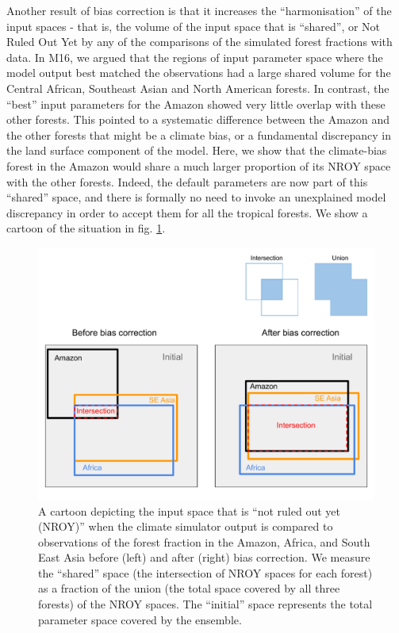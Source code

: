 \documentclass[gmd, manuscript]{copernicus}
\begin{document}
Another result of bias correction is that it increases the ``harmonisation'' of the input spaces - that is, the volume of the input space that is ``shared'', or Not Ruled Out Yet by any of the comparisons of the simulated forest fractions with data. In M16, we argued that the regions of input parameter space where the model output best matched the observations had a large shared volume for the Central African, Southeast Asian and North American forests. In contrast, the ``best'' input parameters for the Amazon showed very little overlap with these other forests. This pointed to a systematic difference between the Amazon and the other forests that might be a climate bias, or a fundamental discrepancy in the land surface component of the model. Here, we show that the climate-bias forest in the Amazon would share a much larger proportion of its NROY space with the other forests. Indeed, the default parameters are now part of this ``shared'' space, and there is formally no need to invoke an unexplained model discrepancy in order to accept them for all the tropical forests. We show a cartoon of the situation in fig. \ref{fig:NROY_cartoon}.

\begin{figure}[t]
\includegraphics[width=12cm]{../graphics/NROY_cartoon.pdf}
\caption{A cartoon depicting the input space that is ``not ruled out yet (NROY)'' when the climate simulator output is compared to observations of the forest fraction in the Amazon, Africa, and South East Asia before (left) and after (right) bias correction. We measure the ``shared'' space (the intersection of NROY spaces for each forest) as a fraction of the union (the total space covered by all three forests) of the NROY spaces. The ``initial'' space represents the total parameter space covered by the ensemble.
}
\label{fig:NROY_cartoon}
\end{figure}
\end{document}
